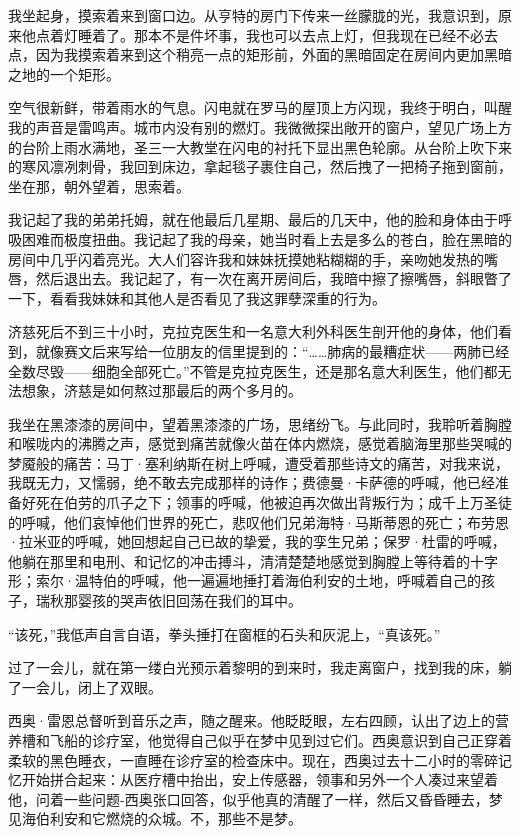 \documentclass[AutoFakeBold=true]{book}
\begin{document}
我坐起身，摸索着来到窗口边。从亨特的房门下传来一丝朦胧的光，我意识到，原来他点着灯睡着了。那本不是件坏事，我也可以去点上灯，但我现在已经不必去点，因为我摸索着来到这个稍亮一点的矩形前，外面的黑暗固定在房间内更加黑暗之地的一个矩形。

空气很新鲜，带着雨水的气息。闪电就在罗马的屋顶上方闪现，我终于明白，叫醒我的声音是雷鸣声。城市内没有别的燃灯。我微微探出敞开的窗户，望见广场上方的台阶上雨水满地，圣三一大教堂在闪电的衬托下显出黑色轮廓。从台阶上吹下来的寒风凛冽刺骨，我回到床边，拿起毯子裹住自己，然后拽了一把椅子拖到窗前，坐在那，朝外望着，思索着。

我记起了我的弟弟托姆，就在他最后几星期、最后的几天中，他的脸和身体由于呼吸困难而极度扭曲。我记起了我的母亲，她当时看上去是多么的苍白，脸在黑暗的房间中几乎闪着亮光。大人们容许我和妹妹抚摸她粘糊糊的手，亲吻她发热的嘴唇，然后退出去。我记起了，有一次在离开房间后，我暗中擦了擦嘴唇，斜眼瞥了一下，看看我妹妹和其他人是否看见了我这罪孽深重的行为。

济慈死后不到三十小时，克拉克医生和一名意大利外科医生剖开他的身体，他们看到，就像赛文后来写给一位朋友的信里提到的：``……肺病的最糟症状——两肺已经全数尽毁——细胞全部死亡。''不管是克拉克医生，还是那名意大利医生，他们都无法想象，济慈是如何熬过那最后的两个多月的。

我坐在黑漆漆的房间中，望着黑漆漆的广场，思绪纷飞。与此同时，我聆听着胸膛和喉咙内的沸腾之声，感觉到痛苦就像火苗在体内燃烧，感觉着脑海里那些哭喊的梦魇般的痛苦：马丁·塞利纳斯在树上呼喊，遭受着那些诗文的痛苦，对我来说，我既无力，又懦弱，绝不敢去完成那样的诗作；费德曼·卡萨德的呼喊，他已经准备好死在伯劳的爪子之下；领事的呼喊，他被迫再次做出背叛行为；成千上万圣徒的呼喊，他们哀悼他们世界的死亡，悲叹他们兄弟海特·马斯蒂恩的死亡；布劳恩·拉米亚的呼喊，她回想起自己已故的挚爱，我的孪生兄弟；保罗·杜雷的呼喊，他躺在那里和电刑、和记忆的冲击搏斗，清清楚楚地感觉到胸膛上等待着的十字形；索尔·温特伯的呼喊，他一遍遍地捶打着海伯利安的土地，呼喊着自己的孩子，瑞秋那婴孩的哭声依旧回荡在我们的耳中。

``该死，''我低声自言自语，拳头捶打在窗框的石头和灰泥上，``真该死。''

过了一会儿，就在第一缕白光预示着黎明的到来时，我走离窗户，找到我的床，躺了一会儿，闭上了双眼。

\vspace*{1em}

西奥·雷恩总督听到音乐之声，随之醒来。他眨眨眼，左右四顾，认出了边上的营养槽和飞船的诊疗室，他觉得自己似乎在梦中见到过它们。西奥意识到自己正穿着柔软的黑色睡衣，一直睡在诊疗室的检查床中。现在，西奥过去十二小时的零碎记忆开始拼合起来：从医疗槽中抬出，安上传感器，领事和另外一个人凑过来望着他，问着一些问题-西奥张口回答，似乎他真的清醒了一样，然后又昏昏睡去，梦见海伯利安和它燃烧的众城。不，那些不是梦。
\end{document}
